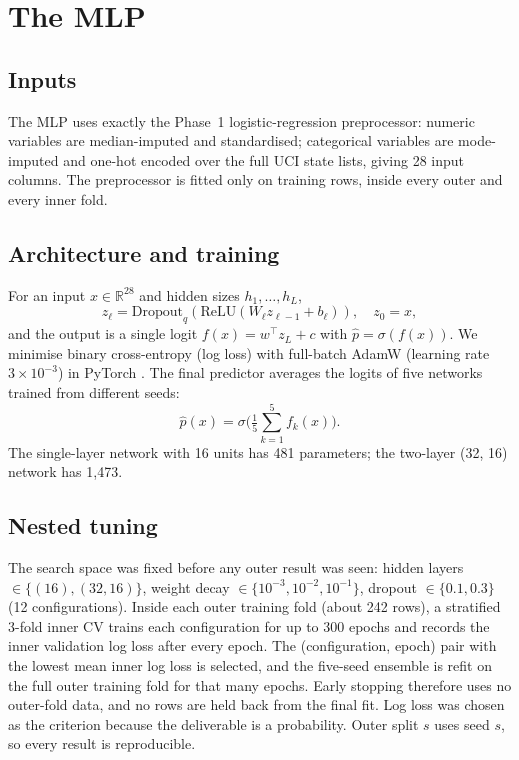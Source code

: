 \documentclass[conference]{IEEEtran}
\begin{document}
\section{The MLP}
\subsection{Inputs}
The MLP uses exactly the Phase~1 logistic-regression preprocessor: numeric variables are median-imputed and standardised; categorical variables are mode-imputed and one-hot encoded over the full UCI state lists, giving 28 input columns. The preprocessor is fitted only on training rows, inside every outer and every inner fold.

\subsection{Architecture and training}
For an input $x\in\mathbb{R}^{28}$ and hidden sizes $h_1,\dots,h_L$,
\begin{equation}
z_\ell=\mathrm{Dropout}_q\!\left(\mathrm{ReLU}(W_\ell z_{\ell-1}+b_\ell)\right),\quad z_0=x,
\end{equation}
and the output is a single logit $f(x)=w^\top z_L+c$ with $\hat p=\sigma(f(x))$. We minimise binary cross-entropy (log loss) with full-batch AdamW (learning rate $3\times10^{-3}$) in PyTorch \cite{paszke2019}. The final predictor averages the logits of five networks trained from different seeds:
\begin{equation}
\hat p(x)=\sigma\!\Big(\tfrac{1}{5}\textstyle\sum_{k=1}^{5} f_k(x)\Big).
\end{equation}
The single-layer network with 16 units has 481 parameters; the two-layer (32, 16) network has 1,473.

\subsection{Nested tuning}
The search space was fixed before any outer result was seen: hidden layers $\in\{(16),(32,16)\}$, weight decay $\in\{10^{-3},10^{-2},10^{-1}\}$, dropout $\in\{0.1,0.3\}$ (12 configurations). Inside each outer training fold (about 242 rows), a stratified 3-fold inner CV trains each configuration for up to 300 epochs and records the inner validation log loss after every epoch. The (configuration, epoch) pair with the lowest mean inner log loss is selected, and the five-seed ensemble is refit on the full outer training fold for that many epochs. Early stopping therefore uses no outer-fold data, and no rows are held back from the final fit. Log loss was chosen as the criterion because the deliverable is a probability. Outer split $s$ uses seed $s$, so every result is reproducible.
\end{document}
